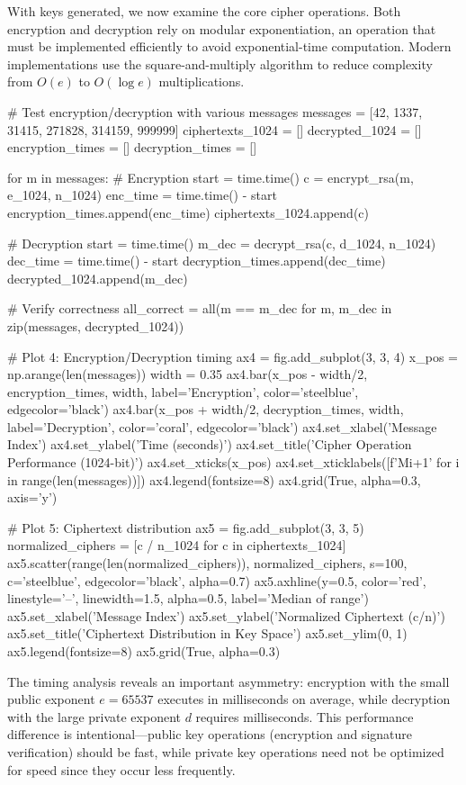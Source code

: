 \documentclass[a4paper, 11pt]{article}
\begin{document}
With keys generated, we now examine the core cipher operations. Both encryption and
decryption rely on modular exponentiation, an operation that must be implemented efficiently
to avoid exponential-time computation. Modern implementations use the square-and-multiply
algorithm to reduce complexity from $O(e)$ to $O(\log e)$ multiplications.

\begin{pycode}
# Test encryption/decryption with various messages
messages = [42, 1337, 31415, 271828, 314159, 999999]
ciphertexts_1024 = []
decrypted_1024 = []
encryption_times = []
decryption_times = []

for m in messages:
    # Encryption
    start = time.time()
    c = encrypt_rsa(m, e_1024, n_1024)
    enc_time = time.time() - start
    encryption_times.append(enc_time)
    ciphertexts_1024.append(c)

    # Decryption
    start = time.time()
    m_dec = decrypt_rsa(c, d_1024, n_1024)
    dec_time = time.time() - start
    decryption_times.append(dec_time)
    decrypted_1024.append(m_dec)

# Verify correctness
all_correct = all(m == m_dec for m, m_dec in zip(messages, decrypted_1024))

# Plot 4: Encryption/Decryption timing
ax4 = fig.add_subplot(3, 3, 4)
x_pos = np.arange(len(messages))
width = 0.35
ax4.bar(x_pos - width/2, encryption_times, width, label='Encryption',
        color='steelblue', edgecolor='black')
ax4.bar(x_pos + width/2, decryption_times, width, label='Decryption',
        color='coral', edgecolor='black')
ax4.set_xlabel('Message Index')
ax4.set_ylabel('Time (seconds)')
ax4.set_title('Cipher Operation Performance (1024-bit)')
ax4.set_xticks(x_pos)
ax4.set_xticklabels([f'M{i+1}' for i in range(len(messages))])
ax4.legend(fontsize=8)
ax4.grid(True, alpha=0.3, axis='y')

# Plot 5: Ciphertext distribution
ax5 = fig.add_subplot(3, 3, 5)
normalized_ciphers = [c / n_1024 for c in ciphertexts_1024]
ax5.scatter(range(len(normalized_ciphers)), normalized_ciphers, s=100,
            c='steelblue', edgecolor='black', alpha=0.7)
ax5.axhline(y=0.5, color='red', linestyle='--', linewidth=1.5,
            alpha=0.5, label='Median of range')
ax5.set_xlabel('Message Index')
ax5.set_ylabel('Normalized Ciphertext (c/n)')
ax5.set_title('Ciphertext Distribution in Key Space')
ax5.set_ylim(0, 1)
ax5.legend(fontsize=8)
ax5.grid(True, alpha=0.3)
\end{pycode}

The timing analysis reveals an important asymmetry: encryption with the small public exponent
$e = 65537$ executes in  milliseconds on average,
while decryption with the large private exponent $d$ requires
 milliseconds. This performance difference is
intentional—public key operations (encryption and signature verification) should be fast,
while private key operations need not be optimized for speed since they occur less frequently.
\end{document}
